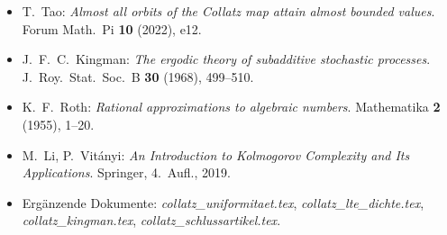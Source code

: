 \documentclass[12pt,a4paper]{article}
\begin{document}
\begin{itemize}
  \item T.\ Tao: \textit{Almost all orbits of the Collatz map attain almost
    bounded values}. Forum Math.\ Pi \textbf{10} (2022), e12.
  \item J.\ F.\ C.\ Kingman: \textit{The ergodic theory of subadditive stochastic
    processes}. J.\ Roy.\ Stat.\ Soc.\ B \textbf{30} (1968), 499--510.
  \item K.\ F.\ Roth: \textit{Rational approximations to algebraic numbers}.
    Mathematika \textbf{2} (1955), 1--20.
  \item M.\ Li, P.\ Vitányi: \textit{An Introduction to Kolmogorov Complexity
    and Its Applications}. Springer, 4.\ Aufl., 2019.
  \item Ergänzende Dokumente: \textit{collatz\_uniformitaet.tex},
    \textit{collatz\_lte\_dichte.tex}, \textit{collatz\_kingman.tex},
    \textit{collatz\_schlussartikel.tex}.
\end{itemize}
\end{document}
